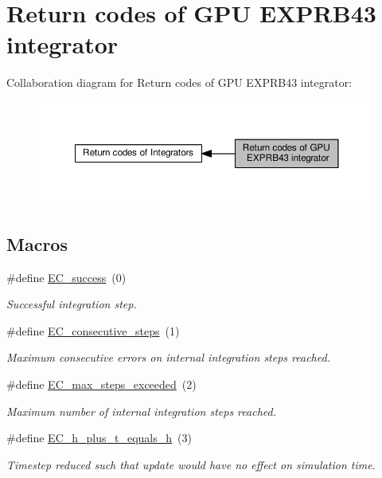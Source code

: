\hypertarget{group__exp4cu__ErrCodes}{}\section{Return codes of G\+PU E\+X\+P\+R\+B43 integrator}
\label{group__exp4cu__ErrCodes}
Collaboration diagram for Return codes of G\+PU E\+X\+P\+R\+B43 integrator\+:
\nopagebreak
\begin{figure}[H]
\begin{center}
\leavevmode
\includegraphics[width=350pt]{group__exp4cu__ErrCodes}
\end{center}
\end{figure}
\subsection*{Macros}
\begin{DoxyCompactItemize}
\item 
\#define \hyperlink{group__exp4cu__ErrCodes_gabd83bc0f9f475a2189a4db4a08b790ca}{E\+C\+\_\+success}~(0)
\begin{DoxyCompactList}\small\item\em Successful integration step. \end{DoxyCompactList}\item 
\#define \hyperlink{group__exp4cu__ErrCodes_gae0287841c08f86f5709660fd731615ad}{E\+C\+\_\+consecutive\+\_\+steps}~(1)
\begin{DoxyCompactList}\small\item\em Maximum consecutive errors on internal integration steps reached. \end{DoxyCompactList}\item 
\#define \hyperlink{group__exp4cu__ErrCodes_ga0f0275d9851ab5c19b79a963d5084df3}{E\+C\+\_\+max\+\_\+steps\+\_\+exceeded}~(2)
\begin{DoxyCompactList}\small\item\em Maximum number of internal integration steps reached. \end{DoxyCompactList}\item 
\#define \hyperlink{group__exp4cu__ErrCodes_ga9326efd544880e2683c4453365ca2704}{E\+C\+\_\+h\+\_\+plus\+\_\+t\+\_\+equals\+\_\+h}~(3)
\begin{DoxyCompactList}\small\item\em Timestep reduced such that update would have no effect on simulation time. \end{DoxyCompactList}\end{DoxyCompactItemize}


